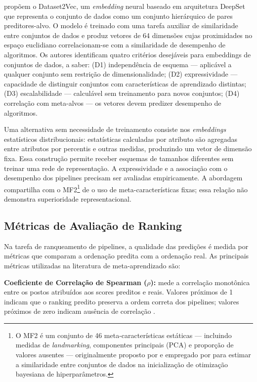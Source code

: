  propõem o Dataset2Vec, um \textit{embedding} neural baseado em arquitetura DeepSet que representa o conjunto de dados como um conjunto hierárquico de pares preditores-alvo. O modelo é treinado com uma tarefa auxiliar de similaridade entre conjuntos de dados e produz vetores de 64 dimensões cujas proximidades no espaço euclidiano correlacionam-se com a similaridade de desempenho de algoritmos. Os autores identificam quatro critérios desejáveis para embeddings de conjuntos de dados, a saber: (D1) independência de esquema — aplicável a qualquer conjunto sem restrição de dimensionalidade; (D2) expressividade — capacidade de distinguir conjuntos com características de aprendizado distintas; (D3) escalabilidade — calculável sem treinamento para novos conjuntos; (D4) correlação com meta-alvos — os vetores devem predizer desempenho de algoritmos.

Uma alternativa sem necessidade de treinamento consiste nos \textit{embeddings} estatísticos distribucionais: estatísticas calculadas por atributo são agregadas entre atributos por percentis e outras medidas, produzindo um vetor de dimensão fixa. Essa construção permite receber esquemas de tamanhos diferentes sem treinar uma rede de representação. A expressividade e a associação com o desempenho dos pipelines precisam ser avaliadas empiricamente. A abordagem compartilha com o MF2\footnote{O MF2 é um conjunto de 46 meta-características estáticas — incluindo medidas de \textit{landmarking}, componentes principais (PCA) e proporção de valores ausentes — originalmente proposto por  e empregado por  para estimar a similaridade entre conjuntos de dados na inicialização de otimização bayesiana de hiperparâmetros.} de  o uso de meta-características fixas; essa relação não demonstra superioridade representacional.

\subsection{Métricas de Avaliação de Ranking}

Na tarefa de ranqueamento de pipelines, a qualidade das predições é medida por métricas que comparam a ordenação predita com a ordenação real. As principais métricas utilizadas na literatura de meta-aprendizado são:

\textbf{Coeficiente de Correlação de Spearman ($\rho$):} mede a correlação monotônica entre os postos atribuídos aos scores preditos e reais. Valores próximos de 1 indicam que o ranking predito preserva a ordem correta dos pipelines; valores próximos de zero indicam ausência de correlação .

